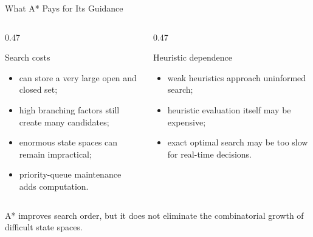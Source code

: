 \documentclass[aspectratio=169,10pt]{beamer}
\begin{document}
\begin{frame}[shrink=20]{What A* Pays for Its Guidance}
  \begin{columns}[T,onlytextwidth]
    \begin{column}{0.47\textwidth}
      \begin{block}{Search costs}
        \begin{itemize}
          \item can store a very large open and closed set;
          \item high branching factors still create many candidates;
          \item enormous state spaces can remain impractical;
          \item priority-queue maintenance adds computation.
        \end{itemize}
      \end{block}
    \end{column}

    \begin{column}{0.47\textwidth}
      \begin{block}{Heuristic dependence}
        \begin{itemize}
          \item weak heuristics approach uninformed search;
          \item heuristic evaluation itself may be expensive;
          \item exact optimal search may be too slow for real-time decisions.
        \end{itemize}
      \end{block}
    \end{column}
  \end{columns}

  \begin{keyidea}
    A* improves search order, but it does not eliminate the combinatorial growth of difficult state spaces.
  \end{keyidea}
\end{frame}

\end{document}
